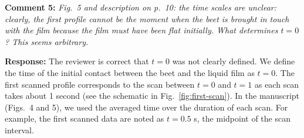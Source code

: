 \documentclass[11pt]{article}
\newif\ifhighlight
\newcommand{\hl}[1]{\ifhighlight\textcolor{blue}{#1}\else#1\fi}
\begin{document}



\bigskip
\begin{siderules}
\textbf{Comment 5:} \textit{Fig.~5 and description on p.~10: the time scales are unclear: clearly, the first profile cannot be the moment when the beet is brought in touch with the film because the film must have been flat initially. What determines $t=0$? This seems arbitrary.}
\end{siderules}

\textbf{Response:} The reviewer is correct that $t=0$ was not clearly defined. We define the time of the initial contact between the beet and the liquid film as $t=0$. The first scanned profile corresponds to the scan between $t=0$ and $t=1$ as each scan takes about 1 second (see the schematic in Fig.~\ref{fig:first-scan}). In the manuscript (Figs.~4 and 5), we used the averaged time over the duration of each scan. For example, the first scanned data are noted as $t=0.5$ s, the midpoint of the scan interval. 
\end{document}
